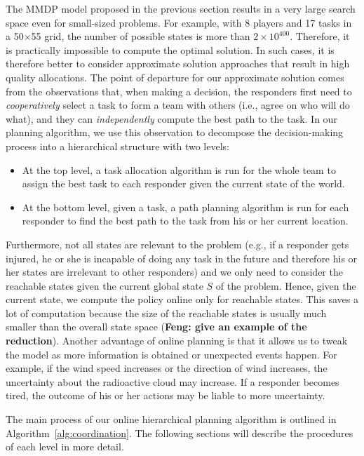 \noindent The  MMDP model proposed in the previous section results in a very large search space even for small-sized problems. For example, with 8 players and 17
tasks in a 50$\times$55 grid, the number of possible states is more
than $2\times 10^{400}$. Therefore, it is practically impossible to compute the optimal solution. In such cases, it is therefore better to consider approximate solution approaches that result in high quality allocations.  The point of departure for our approximate solution comes from the observations that, when making a decision, the responders first
need to {\em cooperatively} select a task to form a team with
others (i.e., agree on who will do what), and they can {\em independently} compute the best path to
the task. In our planning algorithm, we use this observation to
decompose the decision-making process into a hierarchical structure
with two levels:
\begin{itemize}
  \item At the top level, a task allocation algorithm is run for
      the whole team to assign the best task to each responder
      given the current state of the world.
  \item At the bottom level, given a task, a path planning
      algorithm is run for each responder to find the best path
      to the task from his or her current location.
\end{itemize}

Furthermore, not all states are relevant to the problem (e.g., if a
responder gets injured, he or she is incapable of doing any task in
the future and therefore his or her states are irrelevant to other
responders) and we only need to consider the reachable states given
the current global state $S$ of the problem. Hence, given the current state,
we compute the policy online only for reachable states. This saves
a lot of computation because the size of the reachable states is
usually much smaller than the overall state space (\textbf{Feng: give an example of the reduction}). Another
advantage of online planning is that it allows us to tweak the
model as more information is obtained or unexpected events happen.
For example, if the wind speed increases or the direction of wind increases, the uncertainty about
the radioactive cloud may increase. If a responder becomes tired,
the outcome of his or her actions may be liable to more uncertainty.

The main process of our online hierarchical planning algorithm is
outlined in Algorithm~\ref{alg:coordination}. The following
sections will describe the procedures of each level in more detail.

